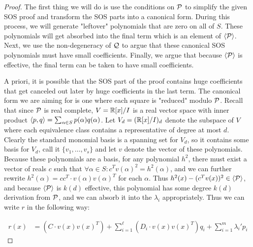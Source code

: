 \begin{proof}
The first thing we will do is use the conditions on $\mathcal P$ to simplify the given SOS proof and transform the SOS parts into a canonical form. During this process, we will generate "leftover" polynomials that are zero on all of $S$. These polynomials will get absorbed into the final term which is an element of $\langle \mathcal P\rangle$. Next, we use the non-degeneracy of $\mathcal Q$ to argue that these canonical SOS polynomials must have small coefficients. Finally, we argue that because $\langle \mathcal P\rangle$ is effective, the final term can be taken to have small coefficients.

A priori, it is possible that the SOS part of the proof contains huge coefficients that get canceled out later by huge coefficients in the last term. The canonical form we are aiming for is one where each square is "reduced" modulo $\mathcal P$. Recall that since $\mathcal P$ is real complete, $V = \mathbb R[x]/I$ is a real vector space with inner product $\langle p, q\rangle = \sum_{\alpha \in S} p(\alpha)q(\alpha)$. Let $V_d = (\mathbb R[x]/I)_d$ denote the subspace of $V$ where each equivalence class contains a representative of degree at most $d$. Clearly the standard monomial basis is a spanning set for $V_d$, so it contains some basis for $V_d$, call it $\{v_1,\dots,v_s\}$ and let $v$ denote the vector of these polynomials. 
Because these polynomials are a basis, for any polynomial $h^2$, there must exist a vector of reals $c$ such that $\forall \alpha \in S: c^Tv(\alpha)^2 = h^2(\alpha)$, and we can further rewrite $h^2(\alpha) = cc^T \cdot v(\alpha)v(\alpha)^T$ for each $\alpha$. Thus $h^2(x) - (c^Tv(x))^2 \in \langle \mathcal P\rangle$, and because $\langle \mathcal P\rangle$ is $k(d)$ effective, this polynomial has some degree $k(d)$ derivation from $\mathcal P$, and we can absorb it into the $\lambda_i$ appropriately. Thus we can write $r$ in the following way:

\begin{align*}
r(x) &= (C \cdot v(x)v(x)^T) + \sum_{i=1}^\ell (D_i \cdot v(x)v(x)^T)q_i + \sum_{i=1}^m \lambda_i'p_i 
\end{align*}


\end{proof}
